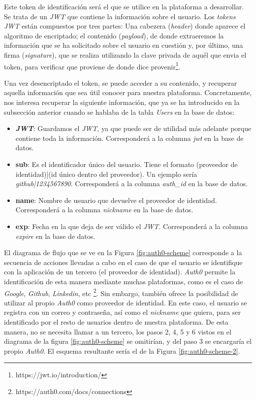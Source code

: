 \documentclass[11pt,spanish,listoffigures]{tfgetsinf}
\begin{document}
Este token de identificación será el que se utilice en la plataforma a desarrollar. Se trata de un \textit{JWT} que contiene la información sobre el usuario. Los \textit{tokens JWT} están compuestos por tres partes: Una cabezera (\textit{header}) donde aparece el algoritmo de encriptado; el contenido (\textit{payload}), de donde extraeremos la información que se ha solicitado sobre el usuario en cuestión y, por último, una firma (\textit{signature}), que se realiza utilizando la clave privada de aquél que envia el token, para verificar que proviene de donde dice provenir\footnote{https://jwt.io/introduction/}.

Una vez desencriptado el token, se puede acceder a su contenido, y recuperar aquella información que sea útil conocer para nuestra plataforma. Concretamente, nos interesa recuperar la siguiente información, que ya se ha introducido en la subsección anterior cuando se hablaba de la tabla \textit{Users} en la base de datos:

\begin{itemize}

\item \textbf{\textit{JWT}}: Guardamos el \textit{JWT}, ya que puede ser de utilidad más adelante porque contiene toda la información. Corresponderá a la columna \textit{jwt} en la base de datos.

\item \textbf{sub}: Es el identificador único del usuario. Tiene el formato (proveedor de identidad)|(id único dentro del proveedor). Un ejemplo sería \textit{github|1234567890}. Corresponderá a la columna \textit{auth\_id} en la base de datos.

\item \textbf{name}: Nombre de usuario que devuelve el proveedor de identidad. Corresponderá a la columna \textit{nickname} en la base de datos.

\item \textbf{exp}: Fecha en la que deja de ser válido el \textit{JWT}. Corresponderá a la columna \textit{expire} en la base de datos.

\end{itemize}

El diagrama de flujo que se ve en la Figura \ref{fig:auth0-scheme} corresponde a la secuencia de acciones llevadas a cabo en el caso de que el usuario se identifique con la aplicación de un tercero (el proveedor de identidad). \textit{Auth0} permite la identificación de esta manera mediante muchas plataformas, como es el caso de \textit{Google}, \textit{Github}, \textit{Linkedin}, etc \footnote{https://auth0.com/docs/connections}. Sin embargo, también ofrece la posibilidad de utilizar al propio \textit{Auth0} como proveedor de identidad. En este caso, el usuario se registra con un correo y contraseña, así como el \textit{nickname} que quiera, para ser identificado por el resto de usuarios dentro de nuestra plataforma. De esta manera, no se necesita llamar a un tercero, los pasos 2, 4, 5 y 6 vistos en el diagrama de la figura \ref{fig:auth0-scheme} se omitirían, y del paso 3 se encargaría el propio \textit{Auth0}. El esquema resultante sería el de la Figura \ref{fig:auth0-scheme-2}.  
\end{document}
